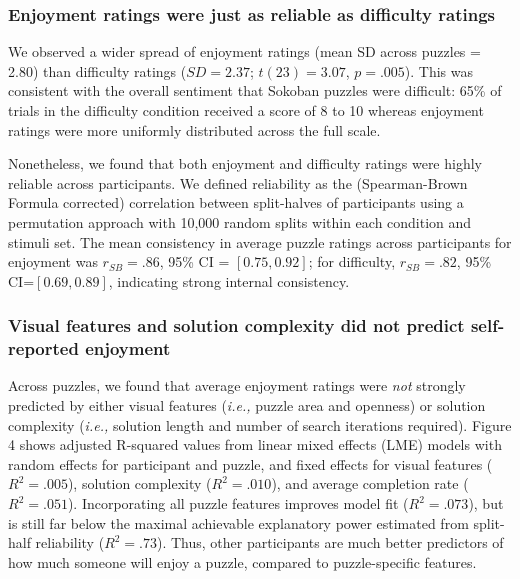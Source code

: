 \documentclass[10pt,letterpaper]{article}
\begin{document}
\subsubsection{Enjoyment ratings were just as reliable as difficulty ratings}

We observed a wider spread of enjoyment ratings (mean SD across puzzles = 2.80) than difficulty ratings ($SD=2.37$; $t(23)=3.07$, $p=.005$). This was consistent with the overall sentiment that Sokoban puzzles were difficult: 65\% of trials in the difficulty condition received a score of 8 to 10 whereas enjoyment ratings were more uniformly distributed across the full scale.

Nonetheless, we found that both enjoyment and difficulty ratings were highly reliable across participants. We defined reliability as the (Spearman-Brown Formula corrected) correlation between split-halves of participants using a permutation approach \cite{parsons2021splithalf} with 10,000 random splits within each condition and stimuli set. The mean consistency in average puzzle ratings across participants for enjoyment was $r_{SB}=.86$, 95\% CI = $[0.75, 0.92]$; for difficulty, $r_{SB}=.82$, 95\% CI=$[0.69, 0.89]$, indicating strong internal consistency.

\subsubsection{Visual features and solution complexity did not predict self-reported enjoyment}
Across puzzles, we found that average enjoyment ratings were \textit{not} strongly predicted by either visual features (\textit{i.e., }puzzle area and openness) or solution complexity (\textit{i.e., }solution length and number of search iterations required). Figure 4 shows adjusted R-squared values from linear mixed effects (LME) models with random effects for participant and puzzle, and fixed effects for visual features ($R^2= .005$), solution complexity ($R^2= .010$), and average completion rate ($R^2=.051$). Incorporating all puzzle features improves model fit ($R^2= .073$), but is still far below the maximal achievable explanatory power estimated from split-half reliability ($R^2=.73$). Thus, other participants are much better predictors of how much someone will enjoy a puzzle, compared to puzzle-specific features.

\end{document}
